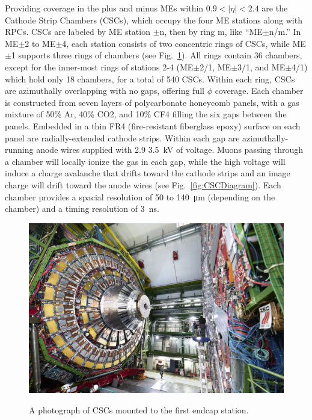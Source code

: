 
Providing coverage in the plus and minus MEs within $0.9<|\eta|<2.4$ are the Cathode Strip Chambers (CSCs), which occupy the four ME stations along with RPCs. CSCs are labeled by ME station $\pm$n, then by ring m, like ``ME$\pm$n/m.'' In ME$\pm$2 to ME$\pm$4, each station consists of two concentric rings of CSCs, while ME$\pm$1 supports three rings of chambers (see Fig.~\ref{fig:CSC}). All rings contain 36 chambers, except for the inner-most rings of stations 2-4 (ME$\pm$2/1, ME$\pm$3/1, and ME$\pm$4/1) which hold only 18 chambers, for a total of 540 CSCs. Within each ring, CSCs are azimuthally overlapping with no gaps, offering full $\phi$ coverage. Each chamber is constructed from seven layers of polycarbonate honeycomb panels, with a gas mixture of 50\% Ar, 40\% CO2, and 10\% CF4 filling the six gaps between the panels. Embedded in a thin FR4 (fire-resistant fiberglass epoxy) surface on each panel are radially-extended cathode strips. Within each gap are azimuthally-running anode wires supplied with 2.9 \SI{3.5}{kV} of voltage. Muons passing through a chamber will locally ionize the gas in each gap, while the high voltage will induce a charge avalanche that drifts toward the cathode strips and an image charge will drift toward the anode wires (see Fig.~\ref{fig:CSCDiagram}). Each chamber provides a spacial resolution of 50 to \SI{140}{\micro\meter} (depending on the chamber) and a timing resolution of \SI{3}{ns}.

\begin{figure}[H]
    \centering
    {\includegraphics[width=1\textwidth]{Images/CMS/CSC.jpg}}
    \caption{A photograph of CSCs mounted to the first endcap station.}
    \label{fig:CSC}
\end{figure}

